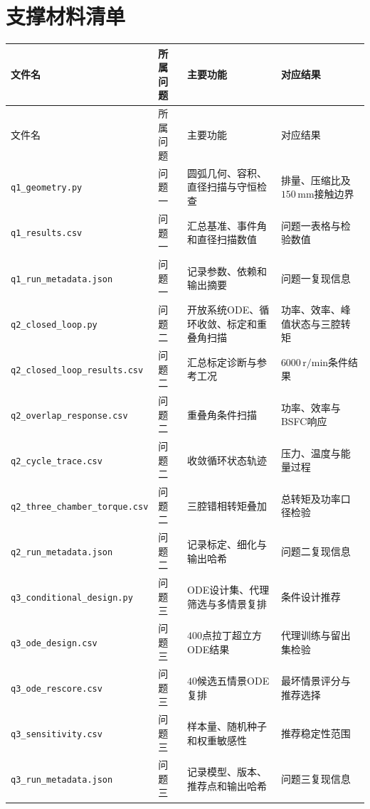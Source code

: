\documentclass[withoutpreface,bwprint]{cumcmthesis}
\begin{document}
\section{支撑材料清单}
\label{app:support-files}
\begin{longtable}{p{}p{}p{}p{}}
\toprule
文件名 & 所属问题 & 主要功能 & 对应结果\\
\midrule
\endfirsthead
\toprule
文件名 & 所属问题 & 主要功能 & 对应结果\\
\midrule
\endhead
\texttt{q1\_geometry.py} & 问题一 & 圆弧几何、容积、直径扫描与守恒检查 & 排量、压缩比及$150\,\mathrm{mm}$接触边界\\
\texttt{q1\_results.csv} & 问题一 & 汇总基准、事件角和直径扫描数值 & 问题一表格与检验数值\\
\texttt{q1\_run\_metadata.json} & 问题一 & 记录参数、依赖和输出摘要 & 问题一复现信息\\
\texttt{q2\_closed\_loop.py} & 问题二 & 开放系统ODE、循环收敛、标定和重叠角扫描 & 功率、效率、峰值状态与三腔转矩\\
\texttt{q2\_closed\_loop\_results.csv} & 问题二 & 汇总标定诊断与参考工况 & $6000\,\mathrm{r/min}$条件结果\\
\texttt{q2\_overlap\_response.csv} & 问题二 & 重叠角条件扫描 & 功率、效率与BSFC响应\\
\texttt{q2\_cycle\_trace.csv} & 问题二 & 收敛循环状态轨迹 & 压力、温度与能量过程\\
\texttt{q2\_three\_chamber\_torque.csv} & 问题二 & 三腔错相转矩叠加 & 总转矩及功率口径检验\\
\texttt{q2\_run\_metadata.json} & 问题二 & 记录标定、细化与输出哈希 & 问题二复现信息\\
\texttt{q3\_conditional\_design.py} & 问题三 & ODE设计集、代理筛选与多情景复排 & 条件设计推荐\\
\texttt{q3\_ode\_design.csv} & 问题三 & $400$点拉丁超立方ODE结果 & 代理训练与留出集检验\\
\texttt{q3\_ode\_rescore.csv} & 问题三 & $40$候选五情景ODE复排 & 最坏情景评分与推荐选择\\
\texttt{q3\_sensitivity.csv} & 问题三 & 样本量、随机种子和权重敏感性 & 推荐稳定性范围\\
\texttt{q3\_run\_metadata.json} & 问题三 & 记录模型、版本、推荐点和输出哈希 & 问题三复现信息\\
\bottomrule
\end{longtable}
\end{document}
